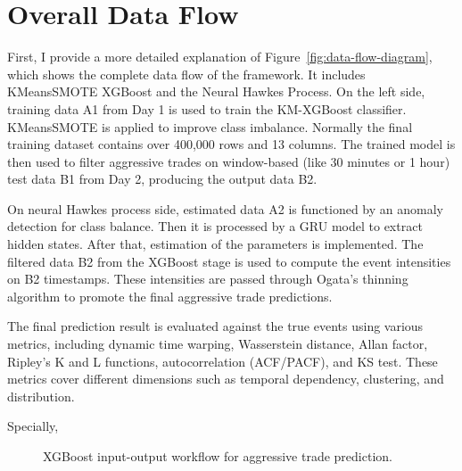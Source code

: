 \section{Overall Data Flow} \label{sec:data-flow}
First, I provide a more detailed explanation of Figure~\ref{fig:data-flow-diagram}, which shows the complete data flow of the framework. It includes KMeansSMOTE XGBoost and the Neural Hawkes Process. On the left side, training data A1 from Day 1 is used to train the KM-XGBoost classifier. KMeansSMOTE is applied to improve class imbalance. Normally the final training dataset contains  over 400,000 rows and 13 columns. The trained model is then used to filter aggressive trades on window-based (like 30 minutes or 1 hour) test data B1 from Day 2, producing the output data B2.

On neural Hawkes process side, estimated data A2 is functioned by an anomaly detection for class balance. Then it is processed by a GRU model to extract hidden states. After that, estimation of the parameters is implemented. The filtered data B2 from the XGBoost stage is used to compute the event intensities on B2 timestamps. These intensities are passed through Ogata's thinning algorithm to promote the final aggressive trade predictions.

The final prediction result is evaluated against the true events using various metrics, including dynamic time warping, Wasserstein distance, Allan factor, Ripley's K and L functions, autocorrelation (ACF/PACF), and KS test. These metrics cover different dimensions such as temporal dependency, clustering, and distribution.

Specially, 

\begin{figure}[H]
\centering
{}
\caption{XGBoost input-output workflow for aggressive trade prediction.}
\label{fig:xgboost-flow}
\end{figure}

